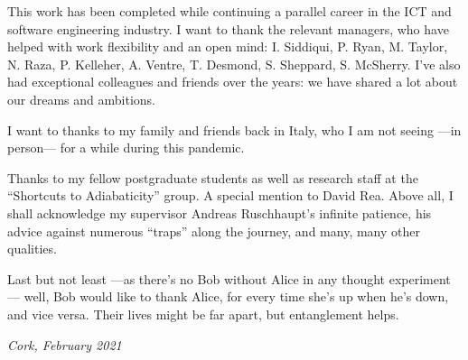 {
  This work has been completed while continuing a parallel career in the ICT and software engineering industry. I want to thank the relevant managers, who have helped with work flexibility and an open mind: I. Siddiqui, P. Ryan, M. Taylor, N. Raza, P. Kelleher, A. Ventre, T. Desmond, S. Sheppard, S. McSherry.
  I've also had exceptional colleagues and friends over the years:
  we have shared a lot about our dreams and ambitions.
  
  I want to thanks to my family and friends back in Italy,
  who I am not seeing ---in person--- for a while during this pandemic.

  Thanks to my fellow postgraduate students
  as well as research staff
  at the ``Shortcuts to Adiabaticity'' group.
  A special mention to David Rea.
  Above all, I shall acknowledge my supervisor Andreas Ruschhaupt's infinite patience,
  his advice against numerous ``traps'' along the journey, and many, many other qualities.

  Last but not least ---as there's no Bob without Alice in any thought ex\-per\-i\-ment---
  well, Bob would like to thank Alice,
  for every time she’s up when he’s down, and vice versa.
  Their lives might be far apart,
  but entanglement helps.

  \emph{Cork, February 2021}
}